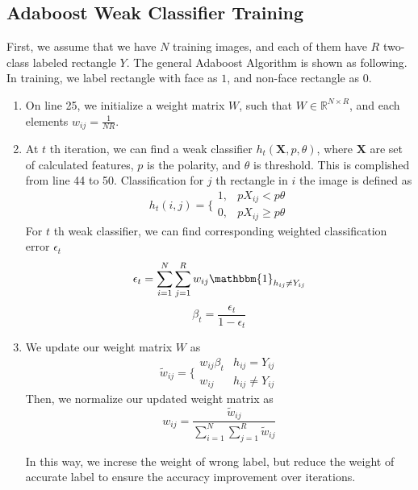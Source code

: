 \documentclass{article}
\begin{document}
	\subsection{Adaboost Weak Classifier Training}
	First, we assume that we have $N$ training images, and each of them have $R$ two-class labeled rectangle $Y$. The general Adaboost Algorithm is shown as following. In training, we label rectangle with face as $1$, and non-face rectangle as $0$.
	\begin{enumerate}[label=\arabic*)]
	\item On line 25, we initialize a weight matrix $W$, such that $W\in\mathbb{R}^{N\times R}$, and each elements $w_{ij}=\frac{1}{NR}$. 
	\item At $t$ th iteration, we can find a weak classifier $h_t(\mathbf{X},p,\theta)$, where $\mathbf{X}$ are set of calculated features, $p$ is the polarity, and $\theta$ is threshold. This is complished from line 44 to 50. Classification for $j$ th rectangle in $i$ the image is defined as  
	\begin{equation}
	h_t(i,j)=\bigg\{\begin{array}{cc}
	1,& p{X}_{ij}<p\theta\\
	0,& p{X}_{ij}\geq p\theta
	\end{array}
	\end{equation}
	For $t$ th weak classifier, we can find corresponding weighted classification error $\epsilon_t$
	\begin{equation}
	\epsilon_t=\sum_{i=1}^{N}\sum_{j=1}^{R}w_{ij}\mathbbm{1}_{h_{ij}\neq Y_{ij}}
	\end{equation}
	\begin{equation}
	\beta_t=\frac{\epsilon_t}{1-\epsilon_t}
	\end{equation}
	\item We update our weight matrix $W$ as
	\begin{equation}
	\tilde{w}_{ij}=\bigg\{\begin{array}{cc}
	w_{ij}\beta_t &h_{ij}= Y_{ij}\\
	w_{ij} & h_{ij}\neq Y_{ij}
	\end{array}
	\end{equation}
	Then, we normalize our updated weight matrix as 
	\begin{equation}
	w_{ij}=\frac{\tilde{w}_{ij}}{\sum_{i=1}^N\sum_{j=1}^R\tilde{w}_{ij}}
	\end{equation}

	\justify In this way, we increse the weight of wrong label, but reduce the weight of accurate label to ensure the accuracy improvement over iterations.
\end{enumerate}
\end{document}
